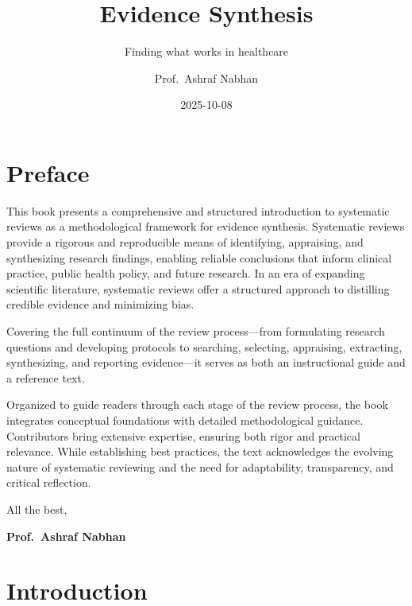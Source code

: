 \documentclass[
  10pt,
  a4paper,
  DIV=11,
  numbers=noendperiod]{scrreprt}
\title{Evidence Synthesis}
\subtitle{Finding what works in healthcare}
\author{Prof.~Ashraf Nabhan}
\date{2025-10-08}
\renewcommand*\contentsname{Table of contents}
\newcommand\contentsname{Table of contents}
\begin{document}
\maketitle

\renewcommand*\contentsname{On this page}
{
\hypersetup{linkcolor=}
\setcounter{tocdepth}{2}
\tableofcontents
}


\chapter*{Preface}\label{preface}


This book presents a comprehensive and structured introduction to
systematic reviews as a methodological framework for evidence synthesis.
Systematic reviews provide a rigorous and reproducible means of
identifying, appraising, and synthesizing research findings, enabling
reliable conclusions that inform clinical practice, public health
policy, and future research. In an era of expanding scientific
literature, systematic reviews offer a structured approach to distilling
credible evidence and minimizing bias.

Covering the full continuum of the review process---from formulating
research questions and developing protocols to searching, selecting,
appraising, extracting, synthesizing, and reporting evidence---it serves
as both an instructional guide and a reference text.

Organized to guide readers through each stage of the review process, the
book integrates conceptual foundations with detailed methodological
guidance. Contributors bring extensive expertise, ensuring both rigor
and practical relevance. While establishing best practices, the text
acknowledges the evolving nature of systematic reviewing and the need
for adaptability, transparency, and critical reflection.

All the best,

\textbf{Prof.~Ashraf Nabhan}


\chapter*{Introduction}\label{introduction}

\end{document}
